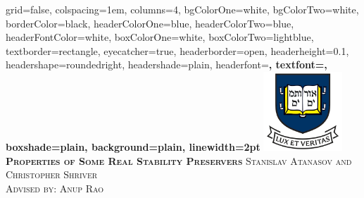 \documentclass[landscape,final,a0paper,fontscale=0.295]{baposter}
\begin{document}
\begin{poster}%
  {
  grid=false,
  colspacing=1em,
  columns=4,
  bgColorOne=white,
  bgColorTwo=white,
  borderColor=black,
  headerColorOne=blue,
  headerColorTwo=blue,
  headerFontColor=white,
  boxColorOne=white,
  boxColorTwo=lightblue,
  textborder=rectangle,
  eyecatcher=true,
  headerborder=open,
  headerheight=0.1\textheight,
  headershape=roundedright,
  headershade=plain,
  headerfont=\Large\bf\textsc, %
  textfont={\setlength{\parindent}{1.5em}},
  boxshade=plain,
  background=plain,
  linewidth=2pt
  }
    {\includegraphics[height=8em]{images/yale}}
  {\bf\textsc{Properties of Some Real Stability Preservers}\vspace{0.5em}}
  {\textsc{ Stanislav Atanasov and Christopher Shriver\\ Advised by: Anup Rao}}
  {%

\setlength{\fboxsep}{0pt}%
\setlength{\fboxrule}{3pt}%
  }

    \newcommand{\colouredcircle}{%
      \tikz{\useasboundingbox (-0.2em,-0.32em) rectangle(0.2em,0.32em); \draw[draw=black,fill=lightblue,line width=0.03em] (0,0) circle(0.18em);}}



\end{poster}
\end{document}
